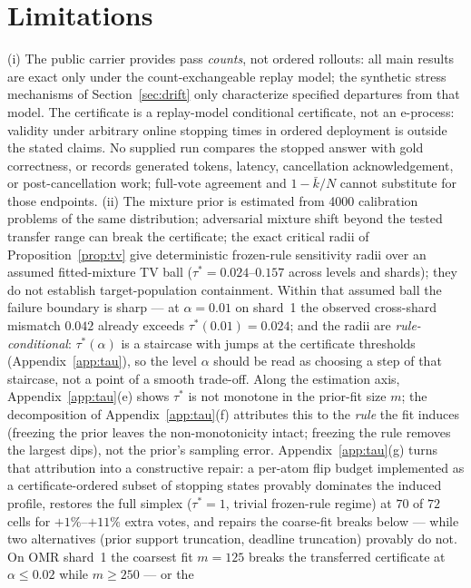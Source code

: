 \documentclass{article}
\theoremstyle{definition}
\theoremstyle{remark}
\begin{document}
\section{Limitations}
\label{sec:limits}
(i) The public carrier provides pass \emph{counts}, not ordered rollouts: all
main results are exact only under the count-exchangeable replay model; the
synthetic stress mechanisms of Section~\ref{sec:drift} only characterize
specified departures from that model. The certificate is a replay-model conditional
certificate, not an e-process: validity under arbitrary online stopping
times in ordered deployment is outside the stated claims. No supplied run
compares the stopped answer with gold correctness, or records generated tokens,
latency, cancellation acknowledgement, or post-cancellation work; full-vote
agreement and $1-\bar k/N$ cannot substitute for those endpoints. (ii) The mixture prior is estimated from 4000
calibration problems of the same distribution; adversarial mixture shift
beyond the tested transfer range can break the certificate; the exact
critical radii of Proposition~\ref{prop:tv} give deterministic frozen-rule
sensitivity radii over an assumed fitted-mixture TV ball
($\tau^*=0.024$--$0.157$ across levels and shards); they do not establish
target-population containment.  Within that assumed ball the failure boundary
is sharp --- at $\alpha=0.01$ on shard~1 the observed cross-shard
mismatch $0.042$ already exceeds $\tau^*(0.01)=0.024$; and the radii are
\emph{rule-conditional}: $\tau^*(\alpha)$ is a staircase with jumps at the
certificate thresholds (Appendix~\ref{app:tau}), so the level $\alpha$
should be read as choosing a step of that staircase, not a point of a
smooth trade-off. Along the estimation axis, Appendix~\ref{app:tau}(e)
shows $\tau^*$ is not monotone in the prior-fit size $m$; the
decomposition of Appendix~\ref{app:tau}(f) attributes this to the
\emph{rule} the fit induces (freezing the prior leaves the
non-monotonicity intact; freezing the rule removes the largest dips),
not the prior's sampling error. Appendix~\ref{app:tau}(g) turns that
attribution into a constructive repair: a per-atom flip budget
implemented as a certificate-ordered subset of stopping states provably
dominates the induced profile, restores the full simplex
($\tau^*=1$, trivial frozen-rule regime) at $70$ of $72$ cells for
$+1\%$--$+11\%$ extra votes, and repairs the coarse-fit breaks below
--- while two alternatives (prior support truncation, deadline
truncation) provably do not. On OMR shard~1 the coarsest fit
$m{=}125$ breaks the
transferred certificate at $\alpha\le0.02$ while $m\ge250$ --- or the
\end{document}
